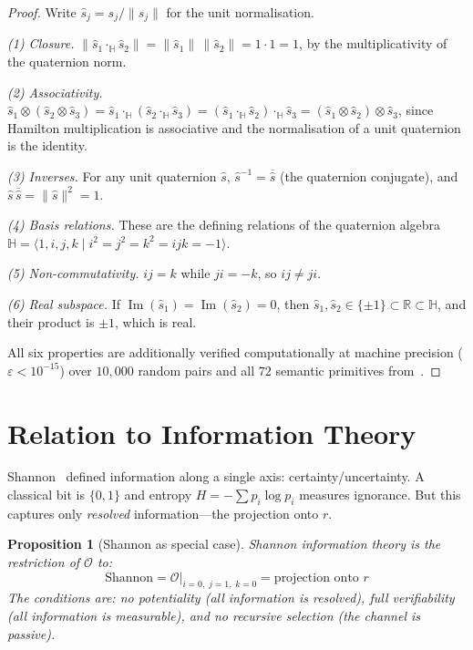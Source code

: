 \documentclass[11pt,a4paper]{article}
\newtheorem{proposition}[theorem]{Proposition}
\newcommand{\Op}{\mathcal{O}}
\newcommand{\rey}[1]{{\color{rcolor}#1}}
\newcommand{\imag}[1]{{\color{icolor}#1}}
\newcommand{\exac}[1]{{\color{jcolor}#1}}
\newcommand{\recu}[1]{{\color{kcolor}#1}}
\newcommand{\Imag}{\operatorname{Im}}
\def\rey#1{#1}%
\def\imag#1{#1}%
\def\exac#1{#1}%
\def\recu#1{#1}%
\begin{document}
\begin{proof}
Write $\hat{s}_j=s_j/\|s_j\|$ for the unit normalisation.

\emph{(1) Closure.}
$\|\hat{s}_1\cdot_{\mathbb{H}}\hat{s}_2\|
=\|\hat{s}_1\|\,\|\hat{s}_2\|=1\cdot1=1$,
by the multiplicativity of the quaternion norm.

\emph{(2) Associativity.}
$\hat{s}_1\otimes(\hat{s}_2\otimes\hat{s}_3)
=\hat{s}_1\cdot_{\mathbb{H}}(\hat{s}_2\cdot_{\mathbb{H}}\hat{s}_3)
=(\hat{s}_1\cdot_{\mathbb{H}}\hat{s}_2)\cdot_{\mathbb{H}}\hat{s}_3
=(\hat{s}_1\otimes\hat{s}_2)\otimes\hat{s}_3$,
since Hamilton multiplication is associative and the normalisation
of a unit quaternion is the identity.

\emph{(3) Inverses.}
For any unit quaternion $\hat{s}$,
$\hat{s}^{-1}=\overline{\hat{s}}$ (the quaternion conjugate),
and $\hat{s}\,\overline{\hat{s}}=\|\hat{s}\|^2=1$.

\emph{(4) Basis relations.}
These are the defining relations of the quaternion algebra
$\mathbb{H}=\langle 1,i,j,k\mid i^2=j^2=k^2=ijk=-1\rangle$.

\emph{(5) Non-commutativity.}
$ij=k$ while $ji=-k$, so $ij\neq ji$.

\emph{(6) Real subspace.}
If $\Imag(\hat{s}_1)=\Imag(\hat{s}_2)=0$, then
$\hat{s}_1,\hat{s}_2\in\{\pm1\}\subset\mathbb{R}\subset\mathbb{H}$,
and their product is $\pm1$, which is real.

All six properties are additionally verified computationally at
machine precision ($\varepsilon<10^{-15}$) over $10{,}000$ random
pairs and all $72$ semantic primitives from~\citet{p2}.
\end{proof}

\section{Relation to Information Theory}
\label{sec:shannon}

Shannon~\citeyearpar{shannon1948} defined information along a single
axis: certainty/uncertainty. A classical bit is $\{0,1\}$ and entropy
$H = -\sum p_i \log p_i$ measures ignorance. But this captures only
\emph{resolved} information---the projection onto $\rey{r}$.

\begin{proposition}[Shannon as special case]
\label{prop:shannon}
Shannon information theory is the restriction of $\Op$ to:
\begin{equation}
\text{Shannon} = \Op\big|_{\imag{i}=0,\;\exac{j}=1,\;\recu{k}=0}
= \text{projection onto } \rey{r}
\end{equation}
The conditions are: no potentiality (all information is resolved),
full verifiability (all information is measurable), and no recursive
selection (the channel is passive).
\end{proposition}
\end{document}
